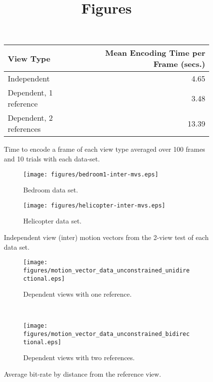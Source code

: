\documentclass[12pt]{article}
\title{Figures}
\author{}
\begin{document}

\begin{figure}
\centering
\begin{tabular}{|l|r|}
\hline
View Type               & Mean Encoding Time per Frame (secs.) \\
\hline
Independent             & 4.65                                 \\
Dependent, 1 reference  & 3.48                                 \\
Dependent, 2 references & 13.39                                \\
\hline
\end{tabular}
\caption{
Time to encode a frame of each view type averaged over 100 frames and 10 trials
with each data-set.
}
\end{figure}

\begin{figure}
\centering
\begin{subfigure}{.4\textwidth}
\centering
\texttt{[image: figures/bedroom1-inter-mvs.eps]}
\caption{Bedroom data set.}
\end{subfigure} \hspace{.8in}
\begin{subfigure}{.4\textwidth}
\centering
\texttt{[image: figures/helicopter-inter-mvs.eps]}
\caption{Helicopter data set.}
\end{subfigure}
\caption{Independent view (inter) motion vectors from the 2-view test of each data set.}
\end{figure}

\begin{figure}
\centering
\begin{subfigure}{\textwidth}
\centering
\texttt{[image: figures/motion\_vector\_data\_unconstrained\_unidirectional.eps]}
\caption{Dependent views with one reference.}
\end{subfigure} \\ \vspace{.3in}
\begin{subfigure}{\textwidth}
\centering
\texttt{[image: figures/motion\_vector\_data\_unconstrained\_bidirectional.eps]}
\caption{Dependent views with two references.}
\end{subfigure}
\caption{Average bit-rate by distance from the reference view.}
\end{figure}

\end{document}
